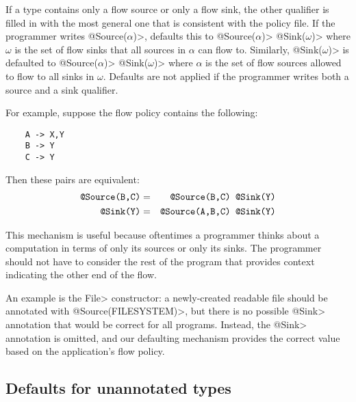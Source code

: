 If a type contains only a flow source or only a flow sink, the other qualifier is
filled in with the most general one that is consistent
with the policy file.
%
If the programmer writes 
\<@Source($\alpha$)>, \theFlowChecker defaults this to
\<@Source($\alpha$)> \<@Sink($\omega$)> where $\omega$ is the
set of flow sinks that all sources in $\alpha$ can flow to.
%
Similarly,
\<@Sink($\omega$)> is defaulted to
\<@Source($\alpha$)> \<@Sink($\omega$)> where $\alpha$ is the
set of flow sources allowed to flow to all sinks in $\omega$.
%
Defaults are not applied if the programmer writes both a source and a
sink qualifier.

For example, suppose the flow policy contains the following:

\begin{Verbatim}
    A -> X,Y
    B -> Y
    C -> Y
\end{Verbatim}
  
\noindent 
Then these pairs are equivalent:
\begin{eqnarray*}
  \mbox{\<@Source({B,C})>} & = & \mbox{\<@Source({B,C}) @Sink(Y)>} \\
  \mbox{\<@Sink(Y)>}       & = & \mbox{\<@Source({A,B,C}) @Sink(Y)>}
\end{eqnarray*}

This mechanism is useful because oftentimes a programmer thinks about a
computation in terms of only its sources or only its sinks.
The programmer should not have to consider the rest of the program
that provides context indicating the other end of the flow.


An example is the \<File> constructor:
a newly-created readable file should be annotated with
\<@Source(FILESYSTEM)>, but there is no possible \<@Sink> annotation
that would be correct for all programs.
Instead, the \<@Sink> annotation is omitted, and
our defaulting mechanism provides the correct value
based on the application's flow policy.

\subsection{Defaults for unannotated types}
\label{sec:unannotated-types}


